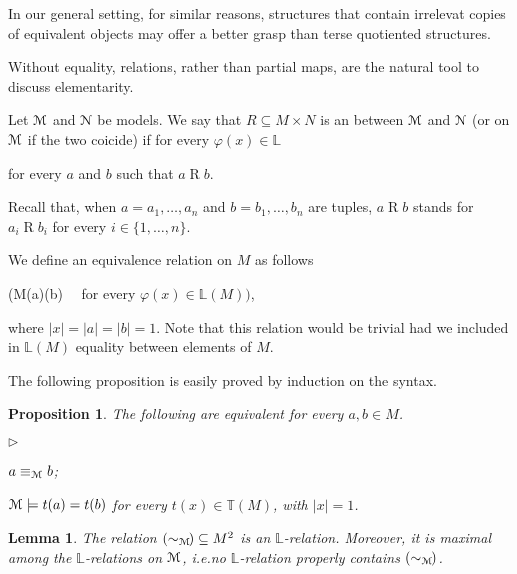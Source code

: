 \documentclass[12pt,letterpaper,oneside,reqno]{amsart}
\newcommand{\mylabel}[1]{{#1}\hfill}
\renewenvironment{itemize}
  {\begin{list}{$\triangleright$}{%
   \setlength{\parskip}{0mm}
   \setlength{\topsep}{.2\baselineskip}
   \setlength{\rightmargin}{0mm}
   \setlength{\listparindent}{0mm}
   \setlength{\itemindent}{0mm}
   \setlength{\labelwidth}{3ex}
   \setlength{\itemsep}{.2\baselineskip}
   \setlength{\parsep}{.2\baselineskip}
   \setlength{\partopsep}{0mm}
   \setlength{\labelsep}{1ex}
   \setlength{\leftmargin}{\labelwidth+\labelsep}
   \let\makelabel\mylabel}}{%
   \end{list}}
\theoremstyle{plain}
\newtheorem{proposition}[theorem]{Proposition}
\newtheorem{lemma}[theorem]{Lemma}
\theoremstyle{remark}
\renewcommand*{\emph}[1]{%
   \smash{\tikz[baseline]\node[rectangle, fill=olive!25, rounded corners, inner xsep=0.5ex, inner ysep=0.2ex, anchor=base, minimum height = 2.7ex]{#1};}}
\begin{document}
In our general setting, for similar reasons, structures that contain irrelevat copies of equivalent objects may offer a better grasp than terse quotiented structures.

Without equality, relations, rather than partial maps, are the natural tool to discuss elementarity. 

Let ${\EuScript M}$ and ${\EuScript N}$ be models.
We say that $R\subseteq M\times N$ is an \emph{$\mathds{L}$-(elementary) relation\/} between ${\EuScript M}$ and ${\EuScript N}$ (or on ${\EuScript M}$ if the two coicide) if for every $\varphi(x)\in\mathds{L}$

 \hfill for every $a$ and $b$ such that $a\mathbin{R}b$.

Recall that, when $a=a_1,\dots,a_n$ and $b=b_1,\dots,b_n$ are tuples, $a\mathbin{R}b$ stands for $a_i\mathbin{R}b_i$ for every $i\in\{1,\dots,n\}$.

We define an equivalence relation \emph{$(\sim_{\EuScript M})$\/} on $ M$ as follows

{\Leftrightarrow}
{\Big({\EuScript M}\models\varphi(a)\leftrightarrow\varphi(b)}
\ \ for every $\varphi(x)\in\mathds{L}( M)\Big)$,

where $|x|=|a|=|b|=1$.
Note that this relation would be trivial had we included  in $\mathds{L}(M)$ equality between elements of $M$.

The following proposition is easily proved by induction on the syntax. 

\begin{proposition}
  The following are equivalent for every $a,b\in M$.
  \begin{itemize}
    \item[1.] $a\equiv_{\EuScript M}b$;
    \item[2.] ${\EuScript M}\models t(a)=t(b)$ for every $t(x)\in\mathds{T}(M)$, with $|x|=1$.\hfill\qedsymbol
  \end{itemize}
\end{proposition}

\begin{lemma}
  The relation $(\sim_{\EuScript M\!})\subseteq  M^2$ is an $\mathds{L}$-relation.
  Moreover, it is maximal among the $\mathds{L}$-relations on ${\EuScript M}$, i.e.\@ no $\mathds{L}$-relation properly contains $(\sim_{\EuScript M\!})$.
\end{lemma}
\end{document}
